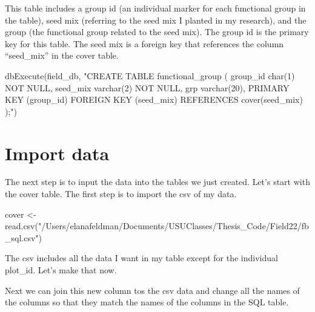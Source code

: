 \documentclass[
]{book}
\newenvironment{Shaded}{\begin{snugshade}}{\end{snugshade}}
\newcommand{\DecValTok}[1]{\textcolor[rgb]{0.00,0.00,0.81}{#1}}
\newcommand{\FunctionTok}[1]{\textcolor[rgb]{0.00,0.00,0.00}{#1}}
\newcommand{\NormalTok}[1]{#1}
\newcommand{\OtherTok}[1]{\textcolor[rgb]{0.56,0.35,0.01}{#1}}
\newcommand{\SpecialCharTok}[1]{\textcolor[rgb]{0.00,0.00,0.00}{#1}}
\newcommand{\StringTok}[1]{\textcolor[rgb]{0.31,0.60,0.02}{#1}}
\begin{document}
This table includes a group id (an individual marker for each functional group in the table), seed mix (referring to the seed mix I planted in my research), and the group (the functional group related to the seed mix). The group id is the primary key for this table. The seed mix is a foreign key that references the column ``seed\_mix'' in the cover table.

\begin{Shaded}
\begin{Highlighting}[]
\FunctionTok{dbExecute}\NormalTok{(field\_db, }\StringTok{"CREATE TABLE functional\_group (}
\StringTok{          group\_id char(1) NOT NULL,}
\StringTok{          seed\_mix varchar(2) NOT NULL,}
\StringTok{          grp varchar(20),}
\StringTok{          PRIMARY KEY (group\_id)}
\StringTok{          FOREIGN KEY (seed\_mix) REFERENCES cover(seed\_mix)}
\StringTok{          );"}\NormalTok{)}
\end{Highlighting}
\end{Shaded}

\hypertarget{import-data}{%
\section{Import data}\label{import-data}}

The next step is to input the data into the tables we just created. Let's start with the cover table. The first step is to import the csv of my data.

\begin{Shaded}
\begin{Highlighting}[]
\NormalTok{cover }\OtherTok{\textless{}{-}} \FunctionTok{read.csv}\NormalTok{(}\StringTok{"/Users/elanafeldman/Documents/USUClasses/Thesis\_Code/Field22/fb\_sql.csv"}\NormalTok{)}
\end{Highlighting}
\end{Shaded}

The csv includes all the data I want in my table except for the individual plot\_id. Let's make that now.

\begin{Shaded}
\end{Shaded}

Next we can join this new column tos the csv data and change all the names of the columns so that they match the names of the columns in the SQL table.
\end{document}
